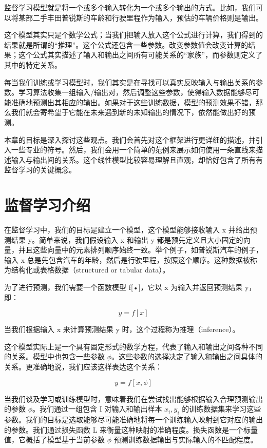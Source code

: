 \documentclass[lang=cn,newtx,10pt,scheme=chinese]{elegantbook}
\begin{document}
监督学习模型就是将一个或多个输入转化为一个或多个输出的方式。比如，我们可以将某部二手丰田普锐斯的车龄和行驶里程作为输入，预估的车辆价格则是输出。

这个模型其实只是个数学公式；当我们把输入放入这个公式进行计算，我们得到的结果就是所谓的“推理”。这个公式还包含一些参数。改变参数值会改变计算的结果；这个公式其实描述了输入和输出之间所有可能关系的“家族”，而参数则定义了其中的特定关系。

每当我们训练或学习模型时，我们其实是在寻找可以真实反映输入与输出关系的参数。学习算法收集一组输入/输出对，然后调整这些参数，使得输入数据能够尽可能准确地预测出其相应的输出。如果对于这些训练数据，模型的预测效果不错，那么我们就会寄希望于它能在未来遇到新的未知输出的情况下，依然能做出好的预测。

本章的目标是深入探讨这些观点。我们会首先对这个框架进行更详细的描述，并引入一些专业的符号。然后，我们会用一个简单的范例来展示如何使用一条直线来描述输入与输出间的关系。这个线性模型比较容易理解且直观，却恰好包含了所有有监督学习的关键概念。

\section{监督学习介绍}

在监督学习中，我们的目标是建立一个模型，这个模型能够接收输入 x 并给出预测结果 y。简单来说，我们假设输入 x 和输出 y 都是预先定义且大小固定的向量，并且这些向量中的元素排列顺序始终一致。举个例子，如普锐斯汽车的例子，输入 x 总是先包含汽车的年龄，然后是行驶里程，按照这个顺序。这种数据被称为结构化或表格数据（structured or tabular data）。

为了进行预测，我们需要一个函数模型 f[•]，它以 x 为输入并返回预测结果 y，即：

\begin{equation}
y = f[x] 
\end{equation}

当我们根据输入 x 来计算预测结果 y 时，这个过程称为推理（inference）。

这个模型实际上是一个具有固定形式的数学方程，代表了输入和输出之间各种不同的关系。模型中也包含一些参数 $\phi$。这些参数的选择决定了输入和输出之间具体的关系。更准确地说，我们应该这样表达这个关系：

\begin{equation}
y = f[x, \phi] 
\end{equation}

当我们谈及学习或训练模型时，意味着我们在尝试找出能够根据输入合理预测输出的参数 $\phi$。我们通过一组包含 I 对输入和输出样本 ${x_i, y_i}$ 的训练数据集来学习这些参数。我们的目标是选取能够尽可能准确地将每一个训练输入映射到它对应的输出的参数。我们通过损失函数 L 来衡量这种映射的准确程度。损失函数是一个标量值，它概括了模型基于当前参数 $\phi$ 预测训练数据输出与实际输入的不匹配程度。
\end{document}
